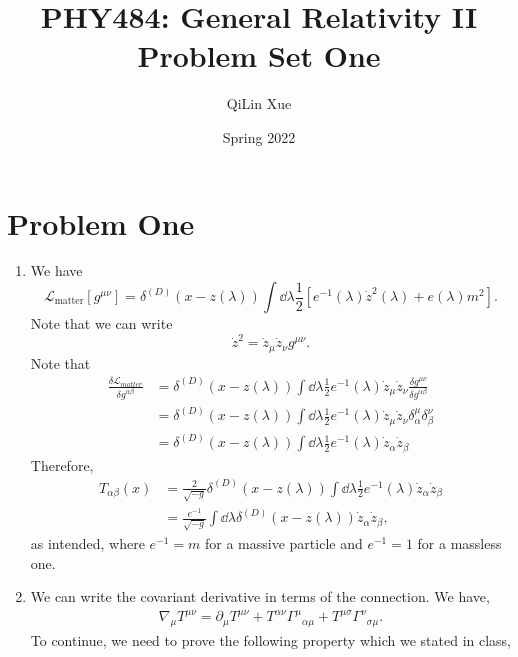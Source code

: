 \documentclass{article}
\title{PHY484: General Relativity II \\ Problem Set One}
\author{QiLin Xue}
\date{Spring 2022}
\numberwithin{equation}{section}
\begin{document}
\maketitle
\tableofcontents
\newpage
\section{Problem One}
\begin{enumerate}[label=(\alph*)]
    \item We have 
    \begin{equation}
        \mathcal{L}_\text{matter}[g^{\mu\nu}] = \delta^{(D)}(x-z(\lambda))\int \dd{\lambda} \frac{1}{2}\left[e^{-1}(\lambda)\dot{z}^2(\lambda)+e(\lambda)m^2\right].
    \end{equation}
    Note that we can write 
    \begin{equation}
        \dot{z}^2 = \dot{z}_\mu \dot{z}_\nu g^{\mu\nu}.
    \end{equation}
    Note that 
    \begin{align}
        \frac{\delta \mathcal{L}_{matter}}{\delta g^{\alpha\beta}} &= \delta^{(D)}(x-z(\lambda))\int \dd{\lambda} \frac{1}{2}e^{-1}(\lambda)\dot{z}_\mu \dot{z}_\nu \frac{\delta g^{\mu\nu}}{\delta g^{\alpha\beta}} \\ 
        &= \delta^{(D)}(x-z(\lambda))\int \dd{\lambda} \frac{1}{2}e^{-1}(\lambda)\dot{z}_\mu \dot{z}_\nu \delta^{\mu}_{\alpha}\delta^{\nu}_{\beta} \\ 
        &= \delta^{(D)}(x-z(\lambda))\int \dd{\lambda} \frac{1}{2}e^{-1}(\lambda)\dot{z}_\alpha \dot{z}_\beta
    \end{align}
    Therefore,
    \begin{align}
        T_{\alpha\beta}(x) &= \frac{2}{\sqrt{-g}}\delta^{(D)}(x-z(\lambda))\int \dd{\lambda} \frac{1}{2}e^{-1}(\lambda)\dot{z}_\alpha \dot{z}_\beta \\ 
        &= \frac{e^{-1}}{\sqrt{-g}}\int\dd{\lambda}\delta^{(D)}(x-z(\lambda))\dot{z}_\alpha\dot{z}_\beta,
    \end{align}
    as intended, where $e^{-1}=m$ for a massive particle and $e^{-1}=1$ for a massless one.
    \item We can write the covariant derivative in terms of the connection. We have,
    \begin{align}
        \nabla_\mu T^{\mu\nu} = \partial_\mu T^{\mu\nu} + T^{\alpha\nu}\Gamma^{\mu}{}_{\alpha\mu} + T^{\mu\sigma}\Gamma^{\nu}{}_{\sigma\mu}.
    \end{align}
    To continue, we need to prove the following property which we stated in class,

\end{enumerate}
\end{document}
